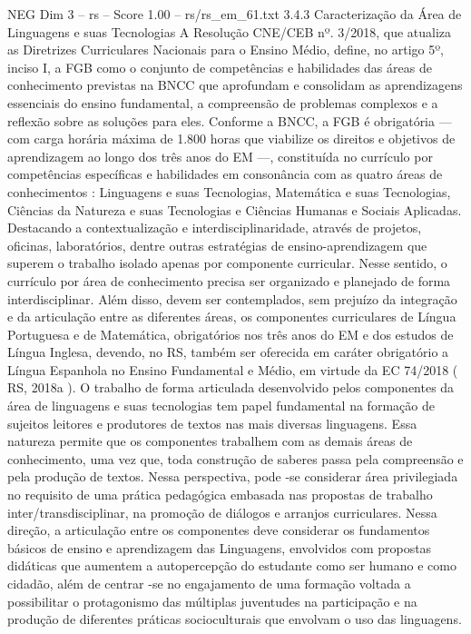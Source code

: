 \begin{textsample}{NEG Dim 3 – rs – Score 1.00 – rs/rs\_em\_61.txt}  \label{ex:f3_neg_048}
3.4.3 Caracterização da Área de Linguagens e suas Tecnologias A Resolução CNE/CEB nº. 3/2018, que atualiza as Diretrizes Curriculares Nacionais para o Ensino Médio, define, no artigo 5º, inciso I, a FGB como o conjunto de competências e habilidades das áreas de conhecimento previstas na BNCC que aprofundam e consolidam as aprendizagens essenciais do ensino fundamental, a compreensão de problemas complexos e a reflexão sobre as soluções para eles.
Conforme a BNCC, a FGB é obrigatória — com carga horária máxima de 1.800 horas que viabilize os direitos e objetivos de aprendizagem ao longo dos três anos do EM —, constituída no currículo por competências específicas e habilidades em consonância com as quatro áreas de conhecimentos : Linguagens e suas Tecnologias, Matemática e suas Tecnologias, Ciências da Natureza e suas Tecnologias e Ciências Humanas e Sociais Aplicadas.
Destacando a contextualização e interdisciplinaridade, através de projetos, oficinas, laboratórios, dentre outras estratégias de ensino-aprendizagem que superem o trabalho isolado apenas por componente curricular.
Nesse sentido, o currículo por área de conhecimento precisa ser organizado e planejado de forma interdisciplinar.
Além disso, devem ser contemplados, sem prejuízo da integração e da articulação entre as diferentes áreas, os componentes curriculares de Língua Portuguesa e de Matemática, obrigatórios nos três anos do EM e dos estudos de Língua Inglesa, devendo, no RS, também ser oferecida em caráter obrigatório a Língua Espanhola no Ensino Fundamental e Médio, em virtude da EC 74/2018 ( RS, 2018a ).
O trabalho de forma articulada desenvolvido pelos componentes da área de linguagens e suas tecnologias tem papel fundamental na formação de sujeitos leitores e produtores de textos nas mais diversas linguagens.
Essa natureza permite que os componentes trabalhem com as demais áreas de conhecimento, uma vez que, toda construção de saberes passa pela compreensão e pela produção de textos.
Nessa perspectiva, pode -se considerar área privilegiada no requisito de uma prática pedagógica embasada nas propostas de trabalho inter/transdisciplinar, na promoção de diálogos e arranjos curriculares.
Nessa direção, a articulação entre os componentes deve considerar os fundamentos básicos de ensino e aprendizagem das Linguagens, envolvidos com propostas didáticas que aumentem a autopercepção do estudante como ser humano e como cidadão, além de centrar -se no engajamento de uma formação voltada a possibilitar o protagonismo das múltiplas juventudes na participação e na produção de diferentes práticas socioculturais que envolvam o uso das linguagens.

\end{textsample}
